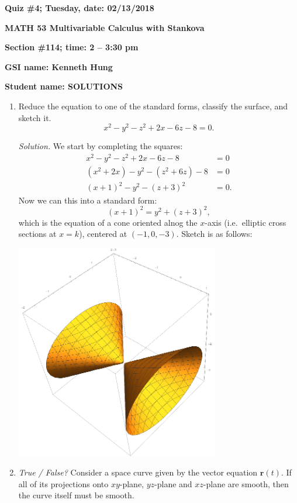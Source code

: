 \documentclass{article}
\newcommand{\rr}{\mathbf{r}}
\begin{document}
{\bf Quiz \#4; Tuesday, date: 02/13/2018}

{\bf MATH 53 Multivariable Calculus with Stankova}

{\bf Section \#114; time: 2 -- 3:30 pm}

{\bf GSI name: Kenneth Hung}

{\bf Student name: SOLUTIONS}

\vspace*{0.25in}

\begin{enumerate}
\item Reduce the equation to one of the standard forms, classify the surface, and sketch it.
\[
x^2 - y^2 - z^2 + 2x - 6z - 8 = 0.
\]

{\em Solution.} We start by completing the squares:
\begin{align*}
x^2 - y^2 - z^2 + 2x - 6z - 8 & = 0 \\
(x^2 + 2x) - y^2 - (z^2 + 6z) - 8 & = 0 \\
(x + 1)^2 - y^2 - (z + 3)^2 & = 0.
\end{align*}
Now we can this into a standard form:
\[
(x + 1)^2 = y^2 + (z + 3)^2,
\]
which is the equation of a cone oriented alnog the $x$-axis (i.e.\ elliptic cross sections at $x = k$), centered at $(-1, 0, -3)$. Sketch is as follows:
\begin{center}
\includegraphics[width=0.7\textwidth]{quiz04dis114solpic}
\end{center}

\item {\em True / False?} Consider a space curve given by the vector equation $\rr(t)$. If all of its projections onto $xy$-plane, $yz$-plane and $xz$-plane are smooth, then the curve itself must be smooth.


\end{enumerate}
\end{document}
